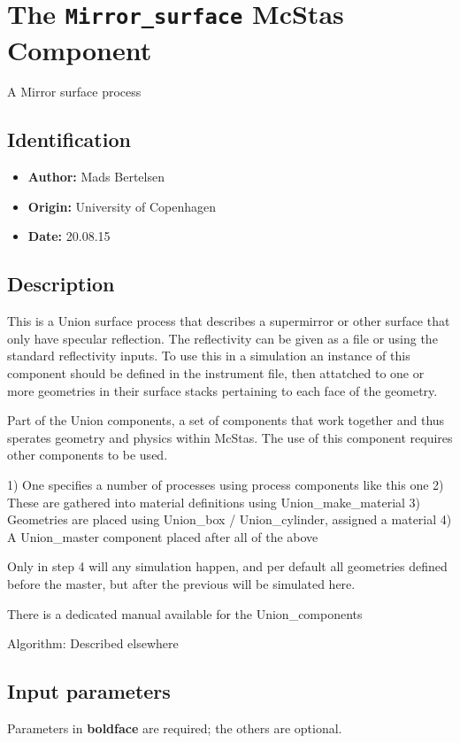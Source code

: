 \section{The \texttt{Mirror\_surface} McStas Component}
A Mirror surface process

\subsection*{Identification}
\begin{itemize}
  \item \textbf{Author:} Mads Bertelsen
  \item \textbf{Origin:} University of Copenhagen
  \item \textbf{Date:} 20.08.15
\end{itemize}

\subsection*{Description}
This is a Union surface process that describes a supermirror or other surface that only have specular reflection. The reflectivity can be given as a file or using the standard reflectivity inputs. To use this in a simulation an instance of this component should be defined in the instrument file, then attatched to one or more geometries in their surface stacks pertaining to each face of the geometry.

Part of the Union components, a set of components that work together and thus sperates geometry and physics within McStas. The use of this component requires other components to be used.

1) One specifies a number of processes using process components like this one 2) These are gathered into material definitions using Union\_make\_material 3) Geometries are placed using Union\_box / Union\_cylinder, assigned a material 4) A Union\_master component placed after all of the above

Only in step 4 will any simulation happen, and per default all geometries defined before the master, but after the previous will be simulated here.

There is a dedicated manual available for the Union\_components

Algorithm: Described elsewhere

\subsection*{Input parameters}
Parameters in \textbf{boldface} are required; the others are optional.

